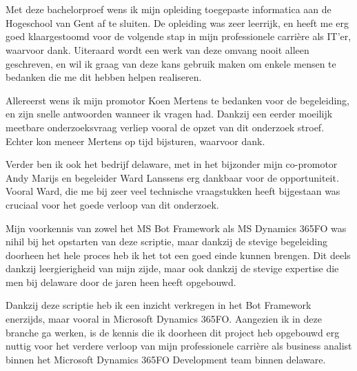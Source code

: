 
\chapter*{}
\label{ch:voorwoord}


Met deze bachelorproef wens ik mijn opleiding toegepaste informatica aan de Hogeschool van Gent af te sluiten. De opleiding was zeer leerrijk, en heeft me erg goed klaargestoomd voor de volgende stap in mijn professionele carrière als IT'er, waarvoor dank. Uiteraard wordt een werk van deze omvang nooit alleen geschreven, en wil ik graag van deze kans gebruik maken om enkele mensen te bedanken die me dit hebben helpen realiseren. 

Allereerst wens ik mijn promotor Koen Mertens te bedanken voor de begeleiding, en zijn snelle antwoorden wanneer ik vragen had. Dankzij een eerder moeilijk meetbare onderzoeksvraag verliep vooral de opzet van dit onderzoek stroef. Echter kon meneer Mertens op tijd bijsturen, waarvoor dank.

 Verder ben ik ook het bedrijf delaware, met in het bijzonder mijn co-promotor Andy Marijs en begeleider Ward Lanssens erg dankbaar voor de opportuniteit. Vooral Ward, die me bij zeer veel technische vraagstukken heeft bijgestaan was cruciaal voor het goede verloop van dit onderzoek. 

Mijn voorkennis van zowel het MS Bot Framework als MS Dynamics 365FO was nihil bij het opstarten van deze scriptie, maar dankzij de stevige begeleiding doorheen het hele proces heb ik het tot een goed einde kunnen brengen. Dit deels dankzij leergierigheid van mijn zijde, maar ook dankzij de stevige expertise die men bij delaware door de jaren heen heeft opgebouwd. 

Dankzij deze scriptie heb ik een inzicht verkregen in het Bot Framework enerzijds, maar vooral in Microsoft Dynamics 365FO. Aangezien ik in deze branche ga werken, is de kennis die ik doorheen dit project heb opgebouwd erg nuttig voor het verdere verloop van mijn professionele carrière als business analist binnen het Microsoft Dynamics 365FO Development team binnen delaware. 

